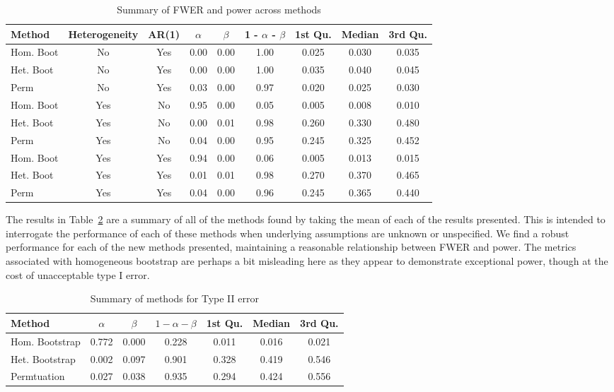 \documentclass{article}
\begin{document}
\begin{table}[H]
\centering
\begin{tabular}{lcccccccc}
  \hline
Method & Heterogeneity & AR(1) & $\alpha$ & $\beta$ & 1 - $\alpha$ - $\beta$ & 1st Qu. & Median & 3rd Qu. \\ 
  \hline
Hom. Boot & No & Yes & 0.00 & 0.00 & 1.00 & 0.025 & 0.030 & 0.035 \\ 
  Het. Boot & No & Yes & 0.00 & 0.00 & 1.00 & 0.035 & 0.040 & 0.045 \\ 
  Perm & No & Yes & 0.03 & 0.00 & 0.97 & 0.020 & 0.025 & 0.030 \\
  \hline
  Hom. Boot & Yes & No & 0.95 & 0.00 & 0.05 & 0.005 & 0.008 & 0.010 \\ 
  Het. Boot & Yes & No & 0.00 & 0.01 & 0.98 & 0.260 & 0.330 & 0.480 \\ 
  Perm & Yes & No & 0.04 & 0.00 & 0.95 & 0.245 & 0.325 & 0.452 \\
  \hline
  Hom. Boot & Yes & Yes & 0.94 & 0.00 & 0.06 & 0.005 & 0.013 & 0.015 \\ 
  Het. Boot & Yes & Yes & 0.01 & 0.01 & 0.98 & 0.270 & 0.370 & 0.465 \\ 
  Perm & Yes & Yes & 0.04 & 0.00 & 0.96 & 0.245 & 0.365 & 0.440 \\ 
   \hline
\end{tabular}
\caption{Summary of FWER and power across methods} 
\label{tab:power_methods}
\end{table}

The results in Table~\ref{tab:type_2_summary} are a summary of all of the methods found by taking the mean of each of the results presented. This is intended to interrogate the performance of each of these methods when underlying assumptions are unknown or unspecified. We find a robust performance for each of the new methods presented, maintaining a reasonable relationship between FWER and power. The metrics associated with homogeneous bootstrap are perhaps a bit misleading here as they appear to demonstrate exceptional power, though at the cost of unacceptable type I error.

\begin{table}[H]
\centering
\begin{tabular}{lcccccc}
  \hline
Method & $\alpha$ & $\beta$ & $1 - \alpha - \beta$ & 1st Qu. & Median & 3rd Qu. \\ 
  \hline
Hom. Bootstrap & 0.772 & 0.000 & 0.228 & 0.011 & 0.016 & 0.021 \\ 
  Het. Bootstrap & 0.002 & 0.097 & 0.901 & 0.328 & 0.419 & 0.546 \\ 
  Permtuation & 0.027 & 0.038 & 0.935 & 0.294 & 0.424 & 0.556 \\ 
   \hline
\end{tabular}
\caption{Summary of methods for Type II error} 
\label{tab:type_2_summary}
\end{table}
\end{document}
